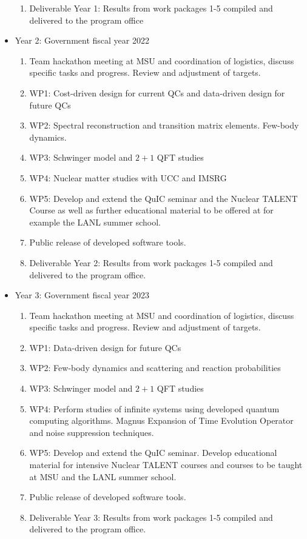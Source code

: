 \documentclass[11pt]{article}
\begin{document}
\begin{itemize}
\begin{enumerate}
\item Deliverable Year 1: Results from work packages 1-5 compiled and delivered to the program office
    \end{enumerate}
    \item Year 2: Government fiscal year 2022
    \begin{enumerate}
        \item Team hackathon meeting at MSU and coordination of logistics, discuss specific tasks and progress. Review and adjustment of targets.
        \item WP1: Cost-driven design for current QCs and data-driven design for future QCs 
\item WP2: Spectral reconstruction and transition matrix elements. Few-body dynamics.
\item WP3: Schwinger model and $2+1$ QFT studies
\item WP4: Nuclear matter studies with UCC and IMSRG
\item WP5: Develop and extend the QuIC seminar and the Nuclear TALENT Course as well as further educational material to be offered at for example the LANL summer school.
\item Public release of developed software tools.
\item Deliverable Year 2: Results from work packages 1-5 compiled and delivered to the program office.
    \end{enumerate}
    \item Year 3: Government fiscal year 2023
    \begin{enumerate}
        \item  Team hackathon meeting at MSU and coordination of logistics, discuss specific tasks and progress. Review and adjustment of targets.
        \item WP1: Data-driven design for future QCs 
\item WP2: Few-body dynamics and scattering and reaction probabilities
\item WP3: Schwinger model and $2+1$ QFT studies
\item WP4: Perform studies of  infinite systems using developed quantum computing algorithms. Magnus Expansion of Time Evolution Operator and noise suppression techniques.
\item WP5: Develop and extend the QuIC seminar. Develop educational material for intensive Nuclear TALENT courses and courses to be taught at MSU and the LANL summer school. 
\item Public release of developed software tools.
\item Deliverable Year 3: Results from work packages 1-5 compiled and delivered to the program office.
    \end{enumerate}
    
\end{itemize}



\end{document}
